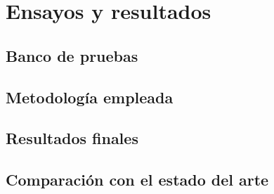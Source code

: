 \chapter{Ensayos y resultados}

\label{Chapter4}



\section{Banco de pruebas}



\section{Metodología empleada}



\section{Resultados finales}



\section{Comparación con el estado del arte}